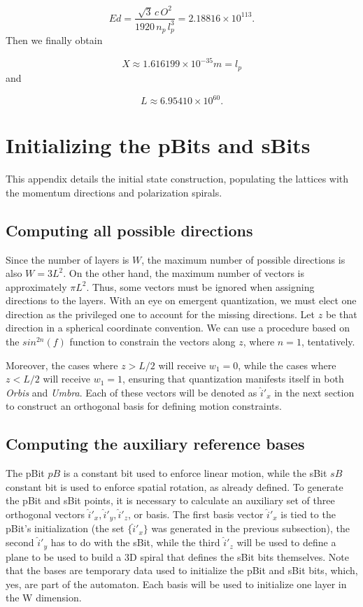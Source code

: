 \documentclass[12pt,english]{article}
\begin{document}
\[
Ed=\frac{\sqrt{3}\,c\,O^{2}}{1920\,n_{p}\,l_{p}^{3}}=2.18816\times10^{113}.
\]
Then we finally obtain

\[
X\approx1.616199\times10^{-35}m=l_{p}
\]
and

\[
L\approx6.95410\times10^{60}.
\]


\newpage{}
\section{Initializing the pBits and sBits} \label{sec:pBits-sBits}

This appendix details the initial state construction, populating the lattices with the momentum directions and polarization spirals.

\subsection{Computing all possible directions} \label{subsec:all-dirs}

Since the number of layers is $W$, the maximum number of possible directions is also $W = 3L^2$. On the other hand, the maximum  number of vectors is approximately $\pi L^2$. Thus, some vectors must be ignored when assigning directions to the layers. With an eye on emergent quantization, we must elect one direction as the privileged one to account for the missing directions. Let $z$ be that direction in a spherical coordinate convention. We can use a procedure based on the $sin^{2n}(f)$ function to constrain the vectors along $z$, where $n=1$, tentatively.

Moreover, the cases where $z > L/2$ will receive $w_1 = 0$, while the cases where $z < L/2$ will receive $w_1 = 1$, ensuring that quantization manifests itself in both \textit{Orbis} and \textit{Umbra}. Each of these vectors will be denoted as $\hat{i}'_x$ in the next section to construct an orthogonal basis for defining motion constraints.

\subsection{Computing the auxiliary reference bases}
The pBit $pB$ is a constant bit used to enforce linear motion, while the sBit $sB$ constant bit is used to enforce spatial rotation, as already defined. To generate the pBit and sBit points, it is necessary to calculate an auxiliary set of three orthogonal vectors $\hat{i}'_x,\hat{i}'_y,\hat{i}'_z$, or basis. The first basis vector $\hat{i}'_x$ is tied to the pBit's initialization (the set $\{\hat{i}'_x\}$ was generated in the previous subsection), the second $\hat{i}'_y$ has to do with the sBit, while the third $\hat{i}'_z$ will be used to define a plane to be used to build a 3D spiral that defines the sBit bits themselves. Note that the bases are temporary data used to initialize the pBit and sBit bits, which, yes, are part of the automaton. Each basis will be used to initialize one layer in the W dimension.
\end{document}
